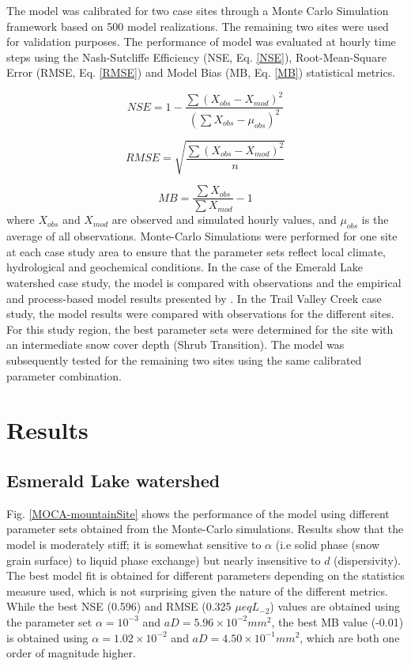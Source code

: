 \documentclass[authoryear,preprint,review,12pt]{elsarticle}
\begin{document}
The model was calibrated for two case sites through a Monte Carlo Simulation framework based on 500 model realizations. The remaining two sites were used for validation purposes. The performance of model was evaluated at hourly time steps using the Nash-Sutcliffe Efficiency (NSE, Eq. \ref{NSE}), Root-Mean-Square Error (RMSE, Eq. \ref{RMSE}) and Model Bias (MB, Eq. \ref{MB}) statistical metrics.

\begin{equation}
NSE = 1-\dfrac{\sum (X_{obs}-X_{mod})^2}{(\sum X_{obs}-\mu_{obs})^2}
\label{NSE}
\end{equation}

\begin{equation}
RMSE = \sqrt{ \dfrac{\sum (X_{obs}-X_{mod})^2}{n} }
\label{RMSE}
\end{equation}

\begin{equation}
MB = \dfrac{\sum X_{obs}}{\sum X_{mod}}-1
\label{MB}
\end{equation}
where $X_{obs}$ and $X_{mod}$ are observed and simulated hourly values, and $\mu_{obs}$ is the average of all observations. Monte-Carlo Simulations were performed for one site at each case study area to ensure that the parameter sets reflect local climate, hydrological and geochemical conditions. In the case of the Emerald Lake watershed case study, the model is compared with observations and the empirical and process-based model results presented by \citet{Harrington1998}. In the Trail Valley Creek case study, the model results were compared with observations for the different sites. For this study region, the best parameter sets were determined for the site with an intermediate snow cover depth (Shrub Transition). The model was subsequently tested for the remaining two sites using the same calibrated parameter combination. 

\section{Results}
\label{chapter:results}

\subsection{Esmerald Lake watershed}

Fig. \ref{MOCA-mountainSite} shows the performance of the model using different parameter sets obtained from the Monte-Carlo simulations. Results show that the model is moderately stiff; it is somewhat sensitive to $\alpha$ (i.e solid phase (snow grain surface) to liquid phase exchange) but nearly insensitive to $d$ (dispersivity). The best model fit is obtained for different parameters depending on the statistics measure used, which is not surprising given the nature of the different metrics. While the best NSE (0.596) and RMSE (0.325 $\mu eq L_{-2}$) values are obtained using the parameter set $\alpha = 10^{-3}$ and $aD = 5.96 \times 10^{-2} mm^2$, the best MB value (-0.01) is obtained using $\alpha = 1.02 \times 10^{-2}$ and $aD = 4.50 \times 10^{-1} mm^2$, which are both one order of magnitude higher. \par
\end{document}
